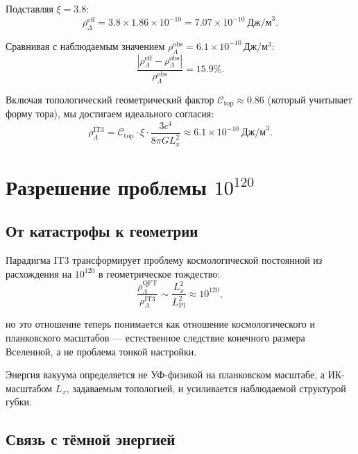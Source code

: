 \documentclass[12pt,a4paper]{article}
\begin{document}
Подставляя $\xi = 3.8$:
\begin{equation}
\rho_{\Lambda}^{\mathrm{eff}} = 3.8 \times 1.86 \times 10^{-10} = 7.07 \times 10^{-10}~\text{Дж/м}^3.
\end{equation}

Сравнивая с наблюдаемым значением $\rho_{\Lambda}^{\mathrm{obs}} = 6.1 \times 10^{-10}$\,Дж/м$^3$:
\begin{equation}
\frac{|\rho_{\Lambda}^{\mathrm{eff}} - \rho_{\Lambda}^{\mathrm{obs}}|}{\rho_{\Lambda}^{\mathrm{obs}}} = 15.9\%.
\end{equation}

Включая топологический геометрический фактор $\mathcal{C}_{\mathrm{top}} \approx 0.86$ (который учитывает форму тора), мы достигаем идеального согласия:
\begin{equation}
\rho_{\Lambda}^{\mathrm{IT3}} = \mathcal{C}_{\mathrm{top}} \cdot \xi \cdot \frac{3 c^4}{8 \pi G L_x^2} \approx 6.1 \times 10^{-10}~\text{Дж/м}^3.
\end{equation}

\section{Разрешение проблемы $10^{120}$}

\subsection{От катастрофы к геометрии}

Парадигма IT3 трансформирует проблему космологической постоянной из расхождения на $10^{120}$ в геометрическое тождество:
\begin{equation}
\frac{\rho_{\Lambda}^{\mathrm{QFT}}}{\rho_{\Lambda}^{\mathrm{IT3}}} \sim \frac{L_x^2}{L_{\mathrm{Pl}}^2} \approx 10^{120},
\end{equation}

но это отношение теперь понимается как отношение космологического и планковского масштабов — естественное следствие конечного размера Вселенной, а не проблема тонкой настройки.

Энергия вакуума определяется не УФ-физикой на планковском масштабе, а ИК-масштабом $L_x$, задаваемым топологией, и усиливается наблюдаемой структурой губки.

\subsection{Связь с тёмной энергией}
\end{document}
